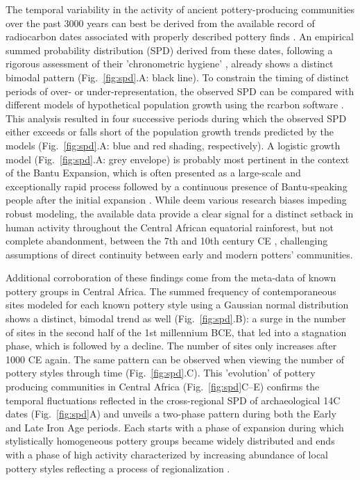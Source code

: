 \documentclass[smallextended,natbib]{svjour3}       %
\begin{document}
The temporal variability in the activity of ancient pottery-producing communities over the past 3000 years can best be derived from the available record of radiocarbon dates associated with properly described pottery finds \citep{Seidensticker.2021f}. An empirical summed probability distribution (SPD) derived from these dates, following a rigorous assessment of their 'chronometric hygiene' \citep{Napolitano.2019}, already shows a distinct bimodal pattern (Fig.~\ref{fig:spd}.A: black line). To constrain the timing of distinct periods of over- or under-representation, the observed SPD can be compared with different models of hypothetical population growth using the rcarbon software \citep{Bevan.2022}. This analysis resulted in four successive periods during which the observed SPD either exceeds or falls short of the population growth trends predicted by the models (Fig.~\ref{fig:spd}.A: blue and red shading, respectively). A logistic growth model (Fig.~\ref{fig:spd}.A: grey envelope) is probably most pertinent in the context of the Bantu Expansion, which is often presented as a large-scale and exceptionally rapid process followed by a continuous presence of Bantu-speaking people after the initial expansion \citep{Pakendorf.2011,Grollemund.2015,Bostoen.2015,Bostoen.2022,Koile.2022}. While \citet{Clist.2023a} deem various research biases impeding robust modeling, the available data provide a clear signal for a distinct setback in human activity throughout the Central African equatorial rainforest, but not complete abandonment, between the 7th and 10th century CE \citep{Seidensticker.2021f}, challenging assumptions of direct continuity between early and modern potters' communities. 

Additional corroboration of these findings come from the meta-data of known pottery groups in Central Africa. The summed frequency of contemporaneous sites modeled for each known pottery style using a Gaussian normal distribution \citet{Roberts.2012} shows a distinct, bimodal trend as well (Fig.~\ref{fig:spd}.B): a surge in the number of sites in the second half of the 1st millennium BCE, that led into a stagnation phase, which is followed by a decline. The number of sites only increases after 1000 CE again. The same pattern can be observed when viewing the number of pottery styles through time (Fig.~\ref{fig:spd}.C). This 'evolution' of pottery producing communities in Central Africa (Fig.~\ref{fig:spd}C--E) confirms the temporal fluctuations reflected in the cross-regional SPD of archaeological 14C dates (Fig.~\ref{fig:spd}A) and unveils a two-phase pattern during both the Early and Late Iron Age periods. Each starts with a phase of expansion during which stylistically homogeneous pottery groups became widely distributed and ends with a phase of high activity characterized by increasing abundance of local pottery styles reflecting a process of regionalization \citep{Seidensticker.2021}. 
\end{document}
